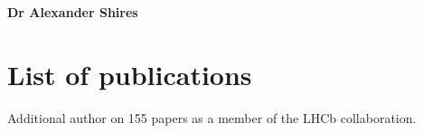 \documentclass[10pt]{article}
\renewenvironment{compactitem}{
  \begin{list}{}{
    \setlength{\leftmargin}{1.5em}
  }
}{
  \end{list}
}
\def\name{Dr Alexander Shires}
\begin{document}
\centerline{\Large \bf \name}


\section*{List of publications} 
\begin{compactitem}
\item {}
\item {}
\item {}
\item {}
\item {}
\item Additional author on 155 papers as a member of the LHCb collaboration.
\end{compactitem}	

\end{document}
